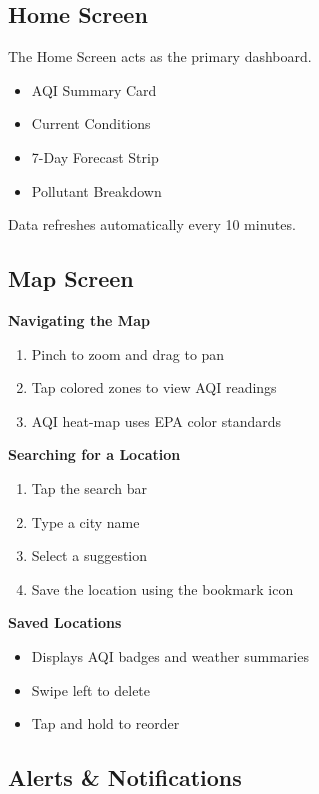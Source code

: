 \documentclass[11pt]{article}
\begin{document}
\subsection{Home Screen}

The Home Screen acts as the primary dashboard.

\begin{itemize}
    \item AQI Summary Card
    \item Current Conditions
    \item 7-Day Forecast Strip
    \item Pollutant Breakdown
\end{itemize}

Data refreshes automatically every 10 minutes.

\subsection{Map Screen}

\textbf{Navigating the Map}

\begin{enumerate}
    \item Pinch to zoom and drag to pan
    \item Tap colored zones to view AQI readings
    \item AQI heat-map uses EPA color standards
\end{enumerate}

\textbf{Searching for a Location}

\begin{enumerate}
    \item Tap the search bar
    \item Type a city name
    \item Select a suggestion
    \item Save the location using the bookmark icon
\end{enumerate}

\textbf{Saved Locations}

\begin{itemize}
    \item Displays AQI badges and weather summaries
    \item Swipe left to delete
    \item Tap and hold to reorder
\end{itemize}

\subsection{Alerts \& Notifications}
\end{document}

